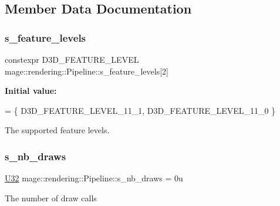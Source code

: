 \subsection{Member Data Documentation}
\hypertarget{structmage_1_1rendering_1_1_pipeline_a9748450c877ec6997796826258f3cbda}{}\label{structmage_1_1rendering_1_1_pipeline_a9748450c877ec6997796826258f3cbda} 
\subsubsection{\texorpdfstring{s\+\_\+feature\+\_\+levels}{s\_feature\_levels}}
{\footnotesize\ttfamily constexpr D3\+D\+\_\+\+F\+E\+A\+T\+U\+R\+E\+\_\+\+L\+E\+V\+EL mage\+::rendering\+::\+Pipeline\+::s\+\_\+feature\+\_\+levels\mbox{[}2\mbox{]}\hspace{0.3cm}{\ttfamily [static]}}

{\bfseries Initial value\+:}
\begin{DoxyCode}
= \{
            D3D\_FEATURE\_LEVEL\_11\_1,
            D3D\_FEATURE\_LEVEL\_11\_0
        \}
\end{DoxyCode}
The supported feature levels. \hypertarget{structmage_1_1rendering_1_1_pipeline_a47d649cdfea830ee048554accd2cab10}{}\label{structmage_1_1rendering_1_1_pipeline_a47d649cdfea830ee048554accd2cab10} 
\subsubsection{\texorpdfstring{s\+\_\+nb\+\_\+draws}{s\_nb\_draws}}
{\footnotesize\ttfamily \hyperlink{namespacemage_a41c104c036fba3756a74e19f793eeaa1}{U32} mage\+::rendering\+::\+Pipeline\+::s\+\_\+nb\+\_\+draws = 0u\hspace{0.3cm}{\ttfamily [static]}}

The number of draw calls 